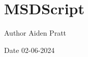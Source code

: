 \chapter{MSDScript}
\hypertarget{index}{}\label{index}
\begin{DoxyAuthor}{Author}
Aiden Pratt 
\end{DoxyAuthor}
\begin{DoxyDate}{Date}
02-\/06-\/2024 
\end{DoxyDate}
